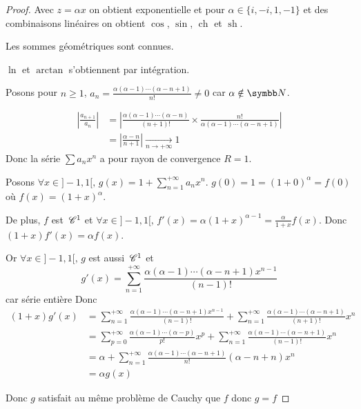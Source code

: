 \begin{proof}
    Avec $z = \alpha x$ on obtient exponentielle et pour $\alpha \in \{i, -i, 1, -1\}$ et des combinaisons linéaires on obtient 
    $\cos$, $\sin$, $\operatorname{ch}$ et $\operatorname{sh}$.

    Les sommes géométriques sont connues. 

    $\ln$ et $\arctan$ s'obtiennent par intégration. 

    Posons pour $n \geqslant 1$, $a_n = \frac{\alpha (\alpha - 1) \cdots (\alpha - n + 1)}{n!} \neq 0$ 
    car $\alpha \notin \N$.  

    \begin{align}
        \left| \frac{a_{n + 1}}{a_n} \right| & = \left| \frac{\alpha (\alpha - 1) \cdots (\alpha - n)}{(n + 1)!} \times \frac{n!}{\alpha (\alpha - 1) \cdots (\alpha - n + 1)} \right| \\
        & = \left| \frac{\alpha - n }{n + 1} \right| \xrightarrow[n \to + \infty]{} 1
    \end{align}
    Donc la série $\sum a_n x^n$ a pour rayon de convergence $R = 1$.

    Posons $\displaystyle \forall x \in ]-1, 1[, \, g(x) = 1 + \sum_{n = 1}^{+\infty} a_n x^n$. 
    $g(0) = 1 = (1 + 0)^\alpha = f(0)$ où $f(x) = (1 + x)^\alpha$. 

    De plus, $f$ est $\,\mathscr C^{1}$ et $\forall x \in ]-1, 1[, \, f'(x) = \alpha (1 + x)^{\alpha - 1} = \frac \alpha {1 + x} f(x)$.
    Donc $(1 + x) f'(x) = \alpha f(x)$. 

    Or $\forall x \in ]-1, 1[, \, g$ est aussi $\,\mathscr C^{1}$ et
    $$ g'(x) = \sum_{n = 1 }^{+ \infty  } \frac{\alpha (\alpha - 1) \cdots (\alpha - n + 1) x^{n - 1}}{(n - 1 )! }$$ car série entière 
    Donc 
    \begin{align}
        (1 + x) g'(x) & = \displaystyle \sum_{n = 1 }^{+ \infty   } \frac{\alpha (\alpha - 1) \cdots (\alpha - n + 1) x^{n - 1}}{(n - 1)!} + \sum_{n = 1 }^{+ \infty   } \frac{\alpha (\alpha - 1) \cdots (\alpha - n + 1) }{(n + 1)!} x^n \\
        & = \sum_{p = 0 }^{+ \infty    } \frac{\alpha (\alpha - 1) \cdots (\alpha - p)}{p!} x^p + \sum_{n = 1 }^{+ \infty   } \frac{\alpha (\alpha - 1) \cdots (\alpha - n + 1)}{(n - 1)!} x^n \\
        & = \alpha + \sum_{n = 1 }^{+ \infty   } \frac{\alpha (\alpha - 1) \cdots (\alpha - n + 1)}{n! } (\alpha - n + n) x^n \\
        & = \alpha g(x)
    \end{align}

    Donc $g$ satisfait au même problème de Cauchy que $f$ donc $g = f$ 
\end{proof}
